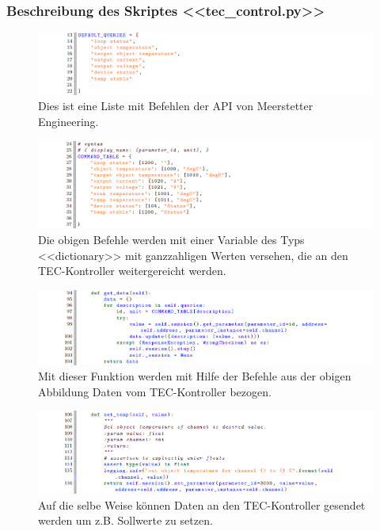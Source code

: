 \begin{appendix}
\begin{landscape}
\subsubsection{Beschreibung des Skriptes <<tec\_control.py>>}

\begin{figure}[H]
    \centering
    \includegraphics[scale=0.8]{98_images/src/fhnw_pro6m_quellcode_34.png}
    \caption*{Dies ist eine Liste mit Befehlen der API von Meerstetter Engineering.}
    \label{fig:fhnw_pro6m_quellcode_34}
\end{figure} 

\begin{figure}[H]
    \centering
    \includegraphics[scale=0.8]{98_images/src/fhnw_pro6m_quellcode_35.png}
    \caption*{Die obigen Befehle werden mit einer Variable des Typs <<dictionary>> mit ganzzahligen Werten versehen, die an den TEC-Kontroller weitergereicht werden.}
    \label{fig:fhnw_pro6m_quellcode_35}
\end{figure} 

\begin{figure}[H]
    \centering
    \includegraphics[scale=0.8]{98_images/src/fhnw_pro6m_quellcode_36.png}
    \caption*{Mit dieser Funktion werden mit Hilfe der Befehle aus der obigen Abbildung Daten vom TEC-Kontroller bezogen.}
    \label{fig:fhnw_pro6m_quellcode_36}
\end{figure} 

\begin{figure}[H]
    \centering
    \includegraphics[scale=0.8]{98_images/src/fhnw_pro6m_quellcode_37.png}
    \caption*{Auf die selbe Weise können Daten an den TEC-Kontroller gesendet werden um z.B. Sollwerte zu setzen.}
    \label{fig:fhnw_pro6m_quellcode_37}
\end{figure} 
\end{landscape}


\end{appendix}
